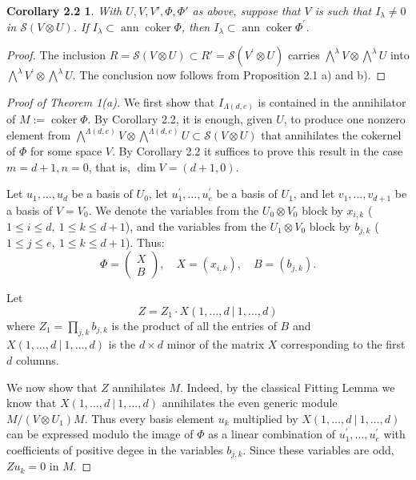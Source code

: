 \documentclass{tran-l}
\theoremstyle{plain}
\newtheorem*{theorem12}{Corollary 2.2}
\theoremstyle{remark}
\theoremstyle{definition}
\newcommand{\myS}{{\mathcal S}}
\newcommand{\coker}{\operatorname{coker}}
\newcommand{\ann}{\operatorname{ann}}
\begin{document}
\begin{theorem12} With $U,V,V',\Phi ,\Phi '$
as above, suppose that $V$ is such that $I_{\lambda }\neq 0$
in $\myS (V\otimes U)$. If $I_{\lambda }\subset \ann \coker \Phi $, then
$I_{\lambda }\subset \ann \coker \Phi ^{\prime }$.
\end{theorem12}
\begin{proof} 
The inclusion $R=\myS (V\otimes U)\subset R'=\myS (V^{\prime }\otimes U)$ carries
$\bigwedge ^{\lambda }V\otimes \bigwedge ^{\lambda }U$
into
$\bigwedge ^{\lambda }V^{\prime }\otimes \bigwedge ^{\lambda }U$.
The conclusion now follows from
Proposition 2.1 a) and b).
\end{proof}
\begin{proof}[Proof of Theorem \textup{1(a)}]
We first show that
$I_{\Lambda (d,e)}$ is contained in the annihilator of
$M:=\coker \Phi $. By Corollary 2.2, it is enough, given $U$, to
produce one nonzero element from
$\bigwedge ^{\Lambda (d,e)}V\otimes \bigwedge ^{\Lambda (d,e)}
U\subset \myS (V\otimes U)
$
that annihilates the cokernel of $\Phi $ for some space $V$.
By Corollary 2.2 it suffices to prove this result
in the case $m=d+1, n=0$, that is,  $\dim V=(d+1,0)$.

Let $u_{1} ,\ldots ,u_{d}$  be a basis of $U_{0}$, let
$u^{\prime }_{1} ,\ldots ,u^{\prime }_{e}$ be
a basis of $U_{1}$,  and let $v_{1} ,\ldots ,v_{d+1}$ be a basis
of $V=V_{0}$.
We denote the variables from the
$U_{0}\otimes V_{0}$ block by $x_{i,k}$ ($1\le i\le d,\ 1\le k\le d+1$),
and the variables from the $U_{1}\otimes V_{0}$ block by
$b_{j,k}$ ($1\le j\le e,\ 1\le k\le d+1$). Thus:
\begin{equation*}
\Phi = \left(\begin{matrix} X\\B\end{matrix}\right),
\quad X=(x_{i,k}), \quad B=(b_{j,k}).
\end{equation*}

Let
\begin{equation*}Z=Z_{1} \cdot X(1,\ldots ,d\ |\ 1,\ldots ,d )\end{equation*}
where $Z_{1} =\prod _{j,k} b_{j,k}$
is the product of all the entries of $B$ and
$X(1,\ldots ,d\ |\ 1,\ldots ,d )$
is the $d\times d$ minor
of the matrix $X$ corresponding to the
first $d$ columns.

We now show that $Z$ annihilates $M$.
Indeed, by the classical
Fitting Lemma we know that $X(1,\ldots ,d\ |\ 1,\ldots ,d )$ annihilates
the even generic module $M/(V\otimes U_{1})M$. Thus
every basis element $u_{k}$ multiplied by
$X(1,\ldots ,d\ |\ 1,\ldots ,d )$
can be expressed modulo the image of $\Phi $
as a linear combination of $u^{\prime }_{1} ,\ldots ,u^{\prime }_{e}$ with
coefficients of positive degee in the
variables $b_{j,k}$. Since these variables are odd,
$Zu_{k} =0$ in $M$.


\end{proof}
\end{document}
